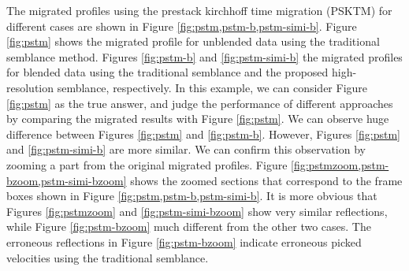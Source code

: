 The migrated profiles using the prestack kirchhoff time migration (PSKTM)  for different cases are shown in Figure \ref{fig:pstm,pstm-b,pstm-simi-b}. Figure \ref{fig:pstm} shows the migrated profile for unblended data using the traditional semblance method. Figures \ref{fig:pstm-b} and \ref{fig:pstm-simi-b}  the migrated profiles for blended data using the traditional semblance and the proposed high-resolution semblance, respectively. In this example, we can consider  Figure \ref{fig:pstm} as the true answer, and judge the performance of different approaches by comparing the migrated results with Figure \ref{fig:pstm}. We can observe huge difference between Figures \ref{fig:pstm} and \ref{fig:pstm-b}. However, Figures \ref{fig:pstm} and \ref{fig:pstm-simi-b} are more similar. We can confirm this observation by zooming a part from the original migrated profiles. Figure \ref{fig:pstmzoom,pstm-bzoom,pstm-simi-bzoom} shows the zoomed sections that correspond to the frame boxes shown in Figure \ref{fig:pstm,pstm-b,pstm-simi-b}. It is more obvious that Figures \ref{fig:pstmzoom} and \ref{fig:pstm-simi-bzoom} show very similar reflections, while Figure \ref{fig:pstm-bzoom}  much different from the other two cases. The erroneous reflections in Figure \ref{fig:pstm-bzoom} indicate erroneous picked velocities using the traditional semblance. 



